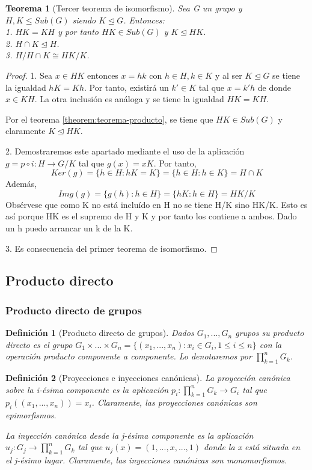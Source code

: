 \documentclass{article}
\theoremstyle{theorem-style}  %
\newtheorem{theorem}{Teorema}[section]  %
\theoremstyle{definition-style}
\newtheorem{definition}{Definición}[section]
\theoremstyle{example-style}
\begin{document}
\begin{theorem}[Tercer teorema de isomorfismo]
Sea G un grupo y $H,K \le Sub(G)$ siendo $K \trianglelefteq G$. Entonces:\\
1. $HK = KH$ y por tanto $HK \in Sub(G)$ y $K \trianglelefteq HK$.\\
2. $H \cap K \trianglelefteq H$.\\
3. $H/H \cap K \cong HK/K$.
\end{theorem}
\begin{proof}
1. Sea $x \in HK$ entonces $x = hk$ con $h \in H, k \in K$ y al ser $K \trianglelefteq G$ se tiene la igualdad $hK = Kh$. Por tanto, existirá un $k' \in K$ tal que $x = k'h$ de donde $x \in KH$. La otra inclusión es análoga y se tiene la igualdad $HK = KH$.

Por el teorema \ref{theorem:teorema-producto}, se tiene que $HK \in Sub(G)$ y claramente $K \trianglelefteq HK$. 

2. Demostraremos este apartado mediante el uso de la aplicación $g=p \circ i: H \rightarrow G/K$ tal que $g(x) = xK$. Por tanto, $$Ker(g) = \{h \in H:hK = K\} = \{h \in H: h \in K\} = H \cap K$$ Además, $$Img(g) = \{g(h):h \in H\} = \{hK: h \in H\} = HK/K$$ Obsérvese que como K no está incluído en H no se tiene H/K sino HK/K. Esto es así porque HK es el supremo de H y K y por tanto los contiene a ambos. Dado un h puedo arrancar un k de la K.
 
3. Es consecuencia del primer teorema de isomorfismo.
\end{proof}

\subsection{Producto directo}

\subsubsection{Producto directo de grupos}

\begin{definition}[Producto directo de grupos]
Dados $G_1,...,G_n$ grupos su producto directo es el grupo $G_1 \times ... \times G_n = \{(x_1,...,x_n):x_i \in G_i,1 \le i \le n\}$ con la operación producto componente a componente. Lo denotaremos por $\prod_{k=1}^{n} G_k$.
\end{definition}

\begin{definition}[Proyecciones e inyecciones canónicas]
La proyección canónica sobre la i-ésima componente es la aplicación $p_i:\prod_{k=1}^{n} G_k \rightarrow G_i$ tal que $p_i((x_1,...,x_n)) = x_i$. Claramente, las proyecciones canónicas son epimorfismos.

La inyección canónica desde la j-ésima componente es la aplicación $u_j:G_j \rightarrow \prod_{k=1}^{n} G_k$ tal que $u_j(x) = (1,...,x,...,1)$ donde la x está situada en el j-ésimo lugar. Claramente, las inyecciones canónicas son monomorfismos.
\end{definition}
\end{document}
